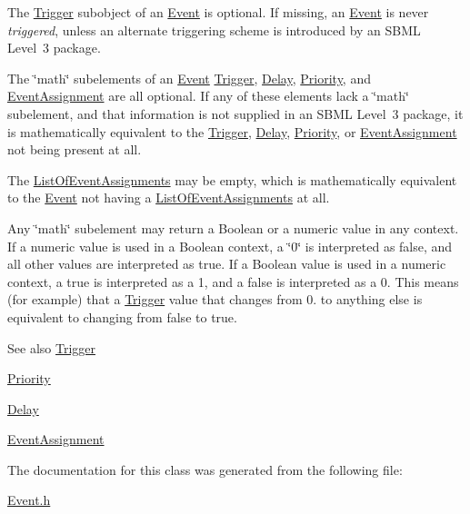 \begin{DoxyItemize}
\item The \hyperlink{class_trigger}{Trigger} subobject of an \hyperlink{class_event}{Event} is optional. If missing, an \hyperlink{class_event}{Event} is never {\itshape triggered}, unless an alternate triggering scheme is introduced by an S\+B\+ML Level~3 package.


\item The \char`\"{}math\char`\"{} subelements of an \hyperlink{class_event}{Event} \hyperlink{class_trigger}{Trigger}, \hyperlink{class_delay}{Delay}, \hyperlink{class_priority}{Priority}, and \hyperlink{class_event_assignment}{Event\+Assignment} are all optional. If any of these elements lack a \char`\"{}math\char`\"{} subelement, and that information is not supplied in an S\+B\+ML Level~3 package, it is mathematically equivalent to the \hyperlink{class_trigger}{Trigger}, \hyperlink{class_delay}{Delay}, \hyperlink{class_priority}{Priority}, or \hyperlink{class_event_assignment}{Event\+Assignment} not being present at all.


\item The \hyperlink{class_list_of_event_assignments}{List\+Of\+Event\+Assignments} may be empty, which is mathematically equivalent to the \hyperlink{class_event}{Event} not having a \hyperlink{class_list_of_event_assignments}{List\+Of\+Event\+Assignments} at all.


\item Any \char`\"{}math\char`\"{} subelement may return a Boolean or a numeric value in any context. If a numeric value is used in a Boolean context, a \char`\"{}0\char`\"{} is interpreted as {\ttfamily false}, and all other values are interpreted as {\ttfamily true}. If a Boolean value is used in a numeric context, a {\ttfamily true} is interpreted as a 1, and a {\ttfamily false} is interpreted as a 0. This means (for example) that a \hyperlink{class_trigger}{Trigger} value that changes from 0. to anything else is equivalent to changing from {\ttfamily false} to {\ttfamily true}. 
\end{DoxyItemize}

\begin{DoxySeeAlso}{See also}
\hyperlink{class_trigger}{Trigger} 

\hyperlink{class_priority}{Priority} 

\hyperlink{class_delay}{Delay} 

\hyperlink{class_event_assignment}{Event\+Assignment} 
\end{DoxySeeAlso}


The documentation for this class was generated from the following file\+:\begin{DoxyCompactItemize}
\item 
\hyperlink{_event_8h}{Event.\+h}\end{DoxyCompactItemize}
